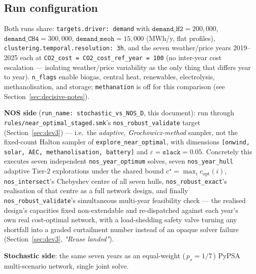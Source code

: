 \documentclass[11pt]{article}
\begin{document}
\subsection{Run configuration}
Both runs share: \texttt{targets.driver: demand} with
$\texttt{demand\_H2} = 200{,}000$, $\texttt{demand\_CH4} = 300{,}000$,
$\texttt{demand\_meoh} = 15{,}000$ (MWh/y, flat profiles),
\texttt{clustering.temporal.resolution: 3h}, and the seven weather/price
years 2019--2025 each at \texttt{CO2\_cost = CO2\_cost\_ref\_year = 100}
(no inter-year cost escalation --- isolating weather/price variability as
the only thing that differs year to year). \texttt{n\_flags} enable
biogas, central heat, renewables, electrolysis, methanolisation, and
storage; \texttt{methanation} is off for this comparison (see
Section~\ref{sec:decisive-notes}).

\textbf{NOS side} (\texttt{run\_name: stochastic\_vs\_NOS\_D}, this document):
run through \texttt{rules/near\_optimal\_staged.smk}'s
\texttt{nos\_robust\_validate} target (Section~\ref{sec:dev3}) --- i.e.\ the
\emph{adaptive, Grochowicz-method} sampler, not the fixed-count Halton
sampler of \texttt{explore\_near\_optimal}, with dimensions
\texttt{[onwind, solar, AEC, methanolisation, battery]} and
$\varepsilon = \texttt{slack} = 0.05$. Concretely this executes seven
independent \texttt{nos\_year\_optimum} solves, seven
\texttt{nos\_year\_hull} adaptive Tier-2 explorations under the shared bound
$c^\star = \max_i c_{\mathrm{opt}}(i)$, \texttt{nos\_intersect}'s Chebyshev
centre of all seven hulls, \texttt{nos\_robust\_exact}'s realisation of that
centre as a full network design, and finally
\texttt{nos\_robust\_validate}'s simultaneous multi-year feasibility check
--- the realised design's capacities fixed non-extendable and re-dispatched
against each year's own real cost-optimal network, with a load-shedding
safety valve turning any shortfall into a graded curtailment number instead
of an opaque solver failure (Section~\ref{sec:dev3}, \emph{"Reuse landed"}).

\textbf{Stochastic side}: the same seven years as an equal-weight
(\,$p_s = 1/7$\,) PyPSA multi-scenario network, single joint solve.
\end{document}
